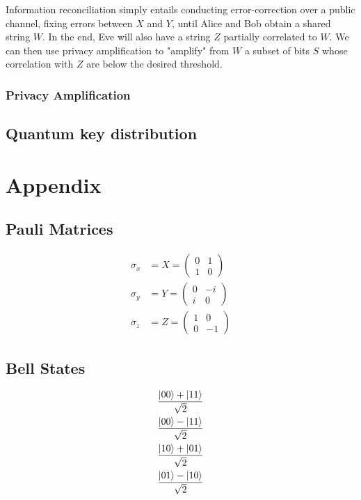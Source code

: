 \documentclass[11pt]{article}
\newcommand\0{\mathbf{0}}
\newcommand\<{\langle}
\renewcommand\>{\rangle}
\begin{document}
Information reconciliation simply entails conducting error-correction over a public channel, fixing errors between $X$ and $Y$, until Alice and Bob obtain a shared string $W$. In the end, Eve will also have a string $Z$ partially correlated to $W$. We can then use privacy amplification to "amplify" from $W$ a subset of bits $S$ whose correlation with $Z$ are below the desired threshold. 

\subsubsection{Privacy Amplification}

\subsection{Quantum key distribution}

\section{Appendix}

\subsection{Pauli Matrices}\label{pauli}
\begin{align*}
\sigma_x &= X = \begin{pmatrix} 0 & 1 \\ 1 & 0\end{pmatrix} \\
\sigma_y &= Y = \begin{pmatrix} 0 & -i \\ i & 0\end{pmatrix}\\
\sigma_z &= Z = \begin{pmatrix} 1 & 0 \\ 0 & -1\end{pmatrix}
\end{align*}

\subsection{Bell States}\label{bellstates}
\begin{align*}
\frac{\ket{00} + \ket{11} }{\sqrt{2}} \\	
\frac{\ket{00} - \ket{11} }{\sqrt{2}} \\	
\frac{\ket{10} + \ket{01} }{\sqrt{2}} \\	
\frac{\ket{01} - \ket{10} }{\sqrt{2}}
\end{align*}
\end{document}
